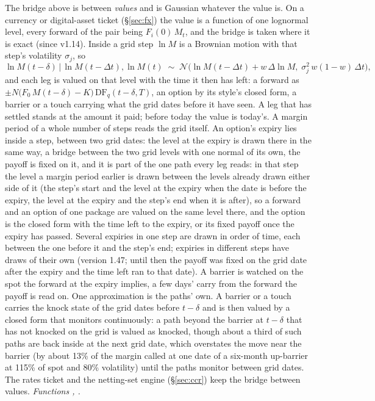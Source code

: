 \documentclass[11pt,a4paper]{article}
\newcommand{\code}[1]{\ifmmode\text{\small\texttt{\detokenize{#1}}}\else{\small\path{#1}}\fi}
\newcommand{\N}{\mathcal{N}}
\begin{document}
The bridge above is between \emph{values} and is Gaussian whatever the value is. On a currency or digital-asset ticket (\S\ref{sec:fx}) the value is a function of one lognormal level, every forward of the pair being $F_i(0)\,M_t$, and the bridge is taken where it is exact (since v1.14). Inside a grid step $\ln M$ is a Brownian motion with that step's volatility $\sigma_j$, so
\begin{equation}
\ln M(t-\delta)\,\big|\,\ln M(t-\Delta t),\ln M(t)\;\sim\;\N\!\big(\ln M(t-\Delta t)+w\,\Delta\ln M,\;\sigma_j^2\,w(1-w)\,\Delta t\big),
\end{equation}
and each leg is valued on that level with the time it then has left: a forward as $\pm N\big(F_0\,M(t-\delta)-K\big)\,\mathrm{DF}_q(t-\delta,T)$, an option by its style's closed form, a barrier or a touch carrying what the grid dates before it have seen. A leg that has settled stands at the amount it paid; before today the value is today's. A margin period of a whole number of steps reads the grid itself. An option's expiry lies inside a step, between two grid dates: the level at the expiry is drawn there in the same way, a bridge between the two grid levels with one normal of its own, the payoff is fixed on it, and it is part of the one path every leg reads: in that step the level a margin period earlier is drawn between the levels already drawn either side of it (the step's start and the level at the expiry when the date is before the expiry, the level at the expiry and the step's end when it is after), so a forward and an option of one package are valued on the same level there, and the option is the closed form with the time left to the expiry, or its fixed payoff once the expiry has passed. Several expiries in one step are drawn in order of time, each between the one before it and the step's end; expiries in different steps have draws of their own (version 1.47; until then the payoff was fixed on the grid date after the expiry and the time left ran to that date). A barrier is watched on the spot the forward at the expiry implies, a few days' carry from the forward the payoff is read on. One approximation is the paths' own. A barrier or a touch carries the knock state of the grid dates before $t-\delta$ and is then valued by a closed form that monitors continuously: a path beyond the barrier at $t-\delta$ that has not knocked on the grid is valued as knocked, though about a third of such paths are back inside at the next grid date, which overstates the move near the barrier (by about 13\% of the margin called at one date of a six-month up-barrier at 115\% of spot and 80\% volatility) until the paths monitor between grid dates. The rates ticket and the netting-set engine (\S\ref{sec:ccr}) keep the bridge between values. \emph{Functions \code{exact_lag}, \code{lagged_values}.}
\end{document}
